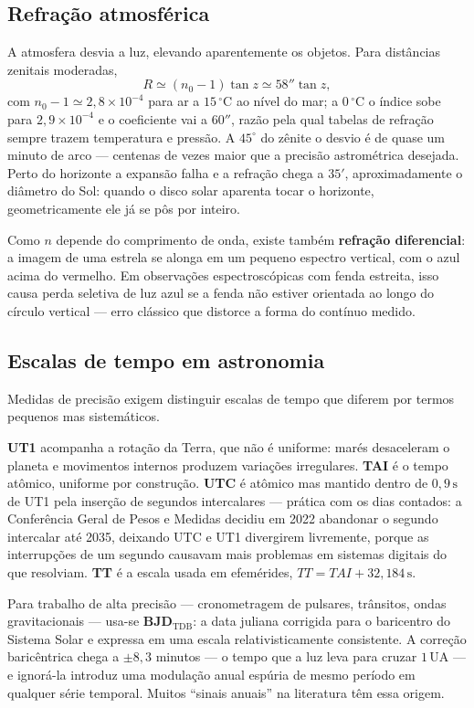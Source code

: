 \documentclass[11pt,a4paper]{article}
\begin{document}
\subsection*{Refração atmosférica}

A atmosfera desvia a luz, elevando aparentemente os objetos. Para distâncias zenitais moderadas,
\[
R\simeq\left(n_0-1\right)\tan z\simeq58''\tan z,
\]
com $n_0-1\simeq2{,}8\times10^{-4}$ para ar a $15\,^\circ$C ao nível do mar; a $0\,^\circ$C o índice sobe para $2{,}9\times10^{-4}$ e o coeficiente vai a $60''$, razão pela qual tabelas de refração sempre trazem temperatura e pressão. A $45^\circ$ do zênite o desvio é de quase um minuto de arco --- centenas de vezes maior que a precisão astrométrica desejada. Perto do horizonte a expansão falha e a refração chega a $35'$, aproximadamente o diâmetro do Sol: quando o disco solar aparenta tocar o horizonte, geometricamente ele já se pôs por inteiro.

Como $n$ depende do comprimento de onda, existe também \textbf{refração diferencial}: a imagem de uma estrela se alonga em um pequeno espectro vertical, com o azul acima do vermelho. Em observações espectroscópicas com fenda estreita, isso causa perda seletiva de luz azul se a fenda não estiver orientada ao longo do círculo vertical --- erro clássico que distorce a forma do contínuo medido.

\subsection*{Escalas de tempo em astronomia}

Medidas de precisão exigem distinguir escalas de tempo que diferem por termos pequenos mas sistemáticos.

\textbf{UT1} acompanha a rotação da Terra, que não é uniforme: marés desaceleram o planeta e movimentos internos produzem variações irregulares. \textbf{TAI} é o tempo atômico, uniforme por construção. \textbf{UTC} é atômico mas mantido dentro de $0{,}9\,\mathrm{s}$ de UT1 pela inserção de segundos intercalares --- prática com os dias contados: a Conferência Geral de Pesos e Medidas decidiu em 2022 abandonar o segundo intercalar até 2035, deixando UTC e UT1 divergirem livremente, porque as interrupções de um segundo causavam mais problemas em sistemas digitais do que resolviam. \textbf{TT} é a escala usada em efemérides, $TT=TAI+32{,}184\,\mathrm{s}$.

Para trabalho de alta precisão --- cronometragem de pulsares, trânsitos, ondas gravitacionais --- usa-se \textbf{BJD}$_\mathrm{TDB}$: a data juliana corrigida para o baricentro do Sistema Solar e expressa em uma escala relativisticamente consistente. A correção baricêntrica chega a $\pm8{,}3$ minutos --- o tempo que a luz leva para cruzar $1\,\mathrm{UA}$ --- e ignorá-la introduz uma modulação anual espúria de mesmo período em qualquer série temporal. Muitos ``sinais anuais'' na literatura têm essa origem.
\end{document}
